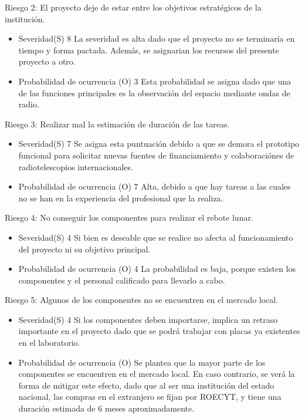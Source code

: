 \documentclass[11pt, %
codirector, %
]{charter}
\begin{document}
Riesgo 2: El proyecto deje de estar entre los objetivos estratégicos de la institución.
\begin{itemize}
	\item Severidad(S) 8\newline
	La severidad es alta dado que el proyecto no se terminaría en tiempo y forma pactada. Además, se asignarian los recursos del presente proyecto a otro. 
	\item Probabilidad de ocurrencia (O) 3 \newline
	Esta probabilidad se asigna dado que una de las funciones principales es la observación del espacio mediante ondas de radio.  
\end{itemize}


Riesgo 3: Realizar mal la estimación de duración de las tareas. 
\begin{itemize}
	\item Severidad(S) 7\newline 
	Se asigna esta puntuación debido a que se demora el prototipo funcional para solicitar nuevas fuentes de financiamiento y colaboraciónes 
	de radiotelescopios internacionales.  
	\item Probabilidad de ocurrencia (O) 7\newline 
	Alta, debido a que hay tareas a las cuales no se han en la experiencia del profesional que la realiza.  
\end{itemize}


Riesgo 4: No conseguir los componentes para realizar el rebote lunar. 
\begin{itemize}
	\item Severidad(S) 4\newline 
		Si bien es deseable que se realice no afecta al funcionamiento del proyecto ni su objetivo principal. 
	\item Probabilidad de ocurrencia (O) 4\newline 
		La probabilidad es baja, porque existen los componentes y el personal calificado para llevarlo a cabo. 
\end{itemize}

Riesgo 5: Algunos de los componentes no se encuentren en el mercado local. 
\begin{itemize}
	\item Severidad(S) 4\newline 
		Si los componentes deben importarse, implica un retraso importante en el proyecto dado que se podrá trabajar con placas ya existentes en el laboratorio. 

	\item Probabilidad de ocurrencia (O) \newline 
	   Se plantea que la mayor parte de los componentes se encuentren en el mercado local. En caso contrario, se verá la forma de mitigar este efecto, dado que al ser una institución del estado nacional, las compras en el extranjero se fijan por ROECYT, y tiene una duración estimada de 6 meses aproximadamente. 
\end{itemize}
\end{document}

